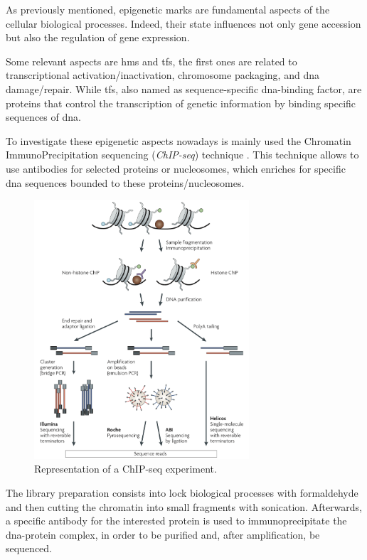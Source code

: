 As previously mentioned, epigenetic marks are fundamental aspects of the cellular biological processes. 
Indeed, their state influences not only gene accession but also the regulation of gene expression.

Some relevant aspects are \glspl{hm} and \glspl{tf}, the first ones are related to transcriptional activation/inactivation, chromosome packaging, and \gls{dna} damage/repair.
While \glspl{tf}, also named as sequence-specific \gls{dna}-binding factor, are proteins that control the transcription of genetic information by binding specific sequences of \gls{dna}.

To investigate these epigenetic aspects nowadays is mainly used the Chromatin ImmunoPrecipitation sequencing (\textit{ChIP-seq}) technique \cite{Park2009}.
This technique allows to use antibodies for selected proteins or nucleosomes, which enriches for specific \gls{dna} sequences bounded to these proteins/nucleosomes.

\begin{figure}[H]
\centering
\includegraphics[width=8cm, keepaspectratio]{img/intro/chip.png}
\caption[ChIP-seq experiment]{Representation of a  ChIP-seq experiment. \cite{Park2009}}
\label{fig:chipseqexp}
\end{figure}

The library preparation consists into lock biological processes with formaldehyde and then cutting the chromatin into small fragments with sonication.
Afterwards, a specific antibody for the interested protein is used to immunoprecipitate the \gls{dna}-protein complex, in order to be purified and, after amplification, be sequenced.

